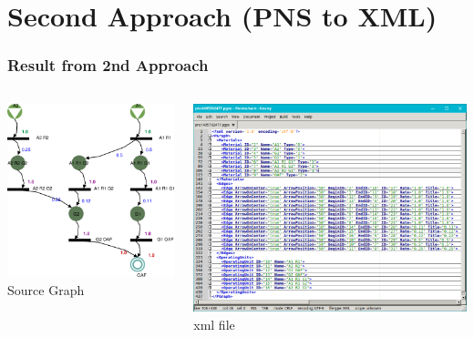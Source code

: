 \documentclass[12pt]{beamer}
\begin{document}
\section{Second Approach (PNS to XML)}


\begin{frame}
\frametitle{Result from 2nd Approach} 

\begin{columns}
	
		\begin{center}	
	\includegraphics[scale=0.3]{output} \\
	Source Graph
	\end{center}
	 
	 
	 \begin{center}	
	\includegraphics[scale=0.19]{erer} \\
	xml file
	\end{center} 
	

\end{columns}
\end{frame}
\end{document}
